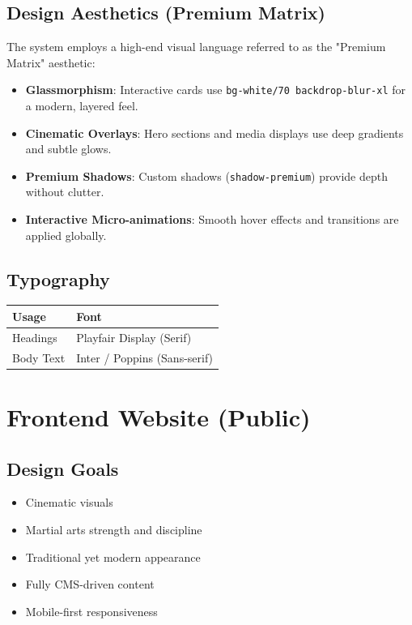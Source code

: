 \documentclass[12pt,a4paper]{article}
\begin{document}
\subsection{Design Aesthetics (Premium Matrix)}
The system employs a high-end visual language referred to as the "Premium Matrix" aesthetic:
\begin{itemize}
    \item \textbf{Glassmorphism}: Interactive cards use \texttt{bg-white/70 backdrop-blur-xl} for a modern, layered feel.
    \item \textbf{Cinematic Overlays}: Hero sections and media displays use deep gradients and subtle glows.
    \item \textbf{Premium Shadows}: Custom shadows (\texttt{shadow-premium}) provide depth without clutter.
    \item \textbf{Interactive Micro-animations}: Smooth hover effects and transitions are applied globally.
\end{itemize}

\subsection{Typography}

\begin{center}
\begin{tabular}{ll}
\toprule
Usage & Font \\
\midrule
Headings & Playfair Display (Serif) \\
Body Text & Inter / Poppins (Sans-serif) \\
\bottomrule
\end{tabular}
\end{center}

\section{Frontend Website (Public)}

\subsection{Design Goals}
\begin{itemize}
    \item Cinematic visuals
    \item Martial arts strength and discipline
    \item Traditional yet modern appearance
    \item Fully CMS-driven content
    \item Mobile-first responsiveness
\end{itemize}
\end{document}
